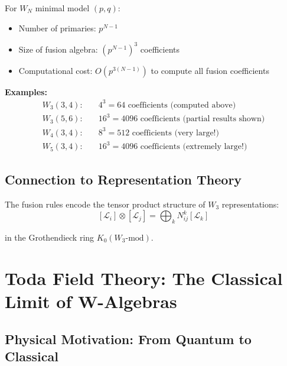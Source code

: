 \begin{remark}\label{rem:wn-complexity}
For $W_N$ minimal model $(p,q)$:
\begin{itemize}
\item Number of primaries: $p^{N-1}$
\item Size of fusion algebra: $(p^{N-1})^3$ coefficients
\item Computational cost: $O(p^{3(N-1)})$ to compute all fusion coefficients
\end{itemize}

\textbf{Examples:}
\begin{align}
W_3(3,4): \quad & 4^3 = 64 \text{ coefficients (computed above)} \\
W_3(5,6): \quad & 16^3 = 4096 \text{ coefficients (partial results shown)} \\
W_4(3,4): \quad & 8^3 = 512 \text{ coefficients (very large!)} \\
W_5(3,4): \quad & 16^3 = 4096 \text{ coefficients (extremely large!)}
\end{align}
\end{remark}

\subsection{Connection to Representation Theory}

The fusion rules encode the tensor product structure of $W_3$ representations:
$$[\mathcal{L}_i] \otimes [\mathcal{L}_j] = \bigoplus_k N_{ij}^k [\mathcal{L}_k]$$

in the Grothendieck ring $K_0(W_3\text{-mod})$.


\section{Toda Field Theory: The Classical Limit of W-Algebras}
\label{sec:toda-classical-limit}

\subsection{Physical Motivation: From Quantum to Classical}


